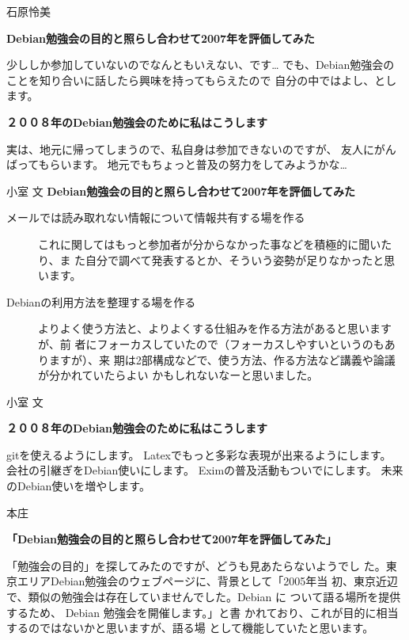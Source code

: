\documentclass[cjk,dvipdfmx,12pt]{beamer}
\begin{document}
\begin{frame}{石原怜美}

\textbf{Debian勉強会の目的と照らし合わせて2007年を評価してみた}

 少ししか参加していないのでなんともいえない、です…
 でも、Debian勉強会のことを知り合いに話したら興味を持ってもらえたので
 自分の中ではよし、とします。

\textbf{２００８年のDebian勉強会のために私はこうします}

 実は、地元に帰ってしまうので、私自身は参加できないのですが、
 友人にがんばってもらいます。
 地元でもちょっと普及の努力をしてみようかな…


\end{frame}\begin{frame}{小室 文}
\textbf{Debian勉強会の目的と照らし合わせて2007年を評価してみた}

\begin{description}
 \item[メールでは読み取れない情報について情報共有する場を作る]
これに関してはもっと参加者が分からなかった事などを積極的に聞いたり、ま
 た自分で調べて発表するとか、そういう姿勢が足りなかったと思います。

 \item[Debianの利用方法を整理する場を作る]
 よりよく使う方法と、よりよくする仕組みを作る方法があると思いますが、前
 者にフォーカスしていたので（フォーカスしやすいというのもありますが）、来
 期は2部構成などで、使う方法、作る方法など講義や論議が分かれていたらよい
 かもしれないなーと思いました。
\end{description}
\end{frame}\begin{frame}{小室 文}

\textbf{２００８年のDebian勉強会のために私はこうします}

gitを使えるようにします。
Latexでもっと多彩な表現が出来るようにします。
会社の引継ぎをDebian使いにします。
Eximの普及活動もついでにします。
未来のDebian使いを増やします。

\end{frame}\begin{frame}{本庄}

\textbf{「Debian勉強会の目的と照らし合わせて2007年を評価してみた」}

「勉強会の目的」を探してみたのですが、どうも見あたらないようでし
た。東京エリアDebian勉強会のウェブページに、背景として「2005年当
初、東京近辺で、類似の勉強会は存在していませんでした。Debian に
ついて語る場所を提供するため、 Debian 勉強会を開催します。」と書
かれており、これが目的に相当するのではないかと思いますが、語る場
として機能していたと思います。


\end{frame}
\end{document}
